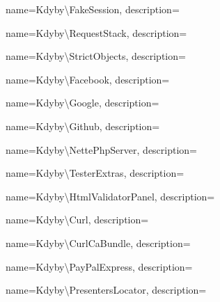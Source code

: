 {
  name={K\-dy\-by\textbackslash{}\-Fa\-ke\-Ses\-si\-on},
  description={} }

 {
  name={K\-dy\-by\textbackslash{}\-Re\-que\-st\-Sta\-ck},
  description={} }

 {
  name={K\-dy\-by\textbackslash{}\-Stri\-ct\-Ob\-je\-ct\-s},
  description={} }

 {
  name={K\-dy\-by\textbackslash{}\-Fa\-ce\-book},
  description={} }

 {
  name={K\-dy\-by\textbackslash{}\-Google},
  description={} }

 {
  name={K\-dy\-by\textbackslash{}\-Git\-hub},
  description={} }

 {
  name={K\-dy\-by\textbackslash{}\-Nette\-Php\-Ser\-ver},
  description={} }

 {
  name={K\-dy\-by\textbackslash{}\-Tes\-ter\-Ex\-tras},
  description={} }

 {
  name={K\-dy\-by\textbackslash{}\-Html\-Va\-li\-da\-tor\-Pa\-nel},
  description={} }

 {
  name={K\-dy\-by\textbackslash{}\-Curl},
  description={} }

 {
  name={K\-dy\-by\textbackslash{}\-Curl\-Ca\-Bund\-le},
  description={} }

 {
  name={K\-dy\-by\textbackslash{}\-Pay\-Pal\-Ex\-press},
  description={} }

 {
  name={K\-dy\-by\textbackslash{}\-Pre\-sen\-ters\-Lo\-ca\-tor},
  description={} }
